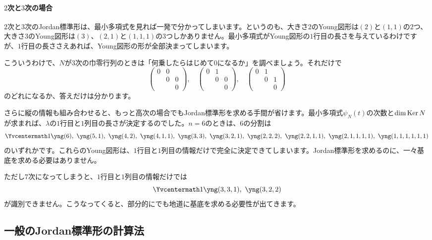\paragraph{$2$次と$3$次の場合}

$2$次と$3$次のJordan標準形は、最小多項式を見れば一発で分かってしまいます。というのも、大きさ$2$のYoung図形は$(2)$と$(1, 1)$の$2$つ、大きさ$3$のYoung図形は$(3)$、$(2, 1)$と$(1, 1, 1)$の$3$つしかありません。最小多項式がYoung図形の$1$行目の長さを与えているわけですが、$1$行目の長ささえあれば、Young図形の形が全部決まってしまいます。

こういうわけで、$N$が$3$次の巾零行列のときは「何乗したらはじめて$0$になるか」を調べましょう。それだけで
\[
\begin{pmatrix}
0 & 0 \\
 & 0 & 0 \\
 & & 0
\end{pmatrix}, \quad
\begin{pmatrix}
0 & 1 \\
 & 0 & 0 \\
 & & 0
\end{pmatrix}, \quad
\begin{pmatrix}
0 & 1 \\
 & 0 & 1 \\
 & & 0
\end{pmatrix}
\]
のどれになるか、答えだけは分かります。

さらに縦の情報も組み合わせると、もっと高次の場合でもJordan標準形を求める手間が省けます。最小多項式$\psi_N(t)$の次数と$\dim \operatorname{Ker} N$が求まれば、$\lambda$の$1$行目と$1$列目の長さが決定するのでした。$n = 6$のときは、$6$の分割は
\[
\Yvcentermath1 \yng(6),\ \yng(5,1),\  \yng(4,2),\  \yng(4,1,1),\ 
\yng(3,3),\  \yng(3,2,1),\  \yng(2,2,2),\  \yng(2,2,1,1),\  \yng(2,1,1,1,1),\  \yng(1,1,1,1,1,1)
\]
のいずれかです。これらのYoung図形は、$1$行目と$1$列目の情報だけで完全に決定できてしまいます。Jordan標準形を求めるのに、一々基底を求める必要はありません。

ただし$7$次になってしまうと、$1$行目と$1$列目の情報だけでは
\[
\Yvcentermath1 \yng(3,3,1),\  \yng(3,2,2)
\]
が識別できません。こうなってくると、部分的にでも地道に基底を求める必要性が出てきます。

\subsection{一般のJordan標準形の計算法}

